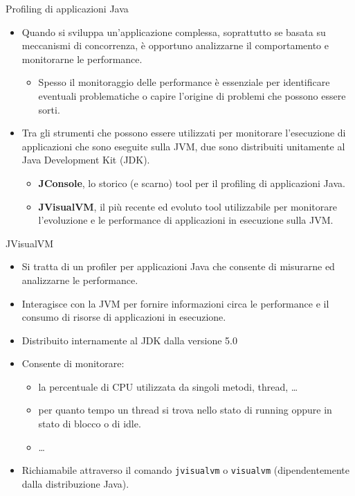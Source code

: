 \documentclass[presentation]{beamer}
\begin{document}
\begin{frame}{Profiling di applicazioni Java}
\begin{itemize}\itemsep10pt
\item Quando si sviluppa un'applicazione complessa, soprattutto se basata su meccanismi di concorrenza, è opportuno analizzarne il comportamento e monitorarne le performance.
\begin{itemize}
\item Spesso il monitoraggio delle performance è essenziale per identificare eventuali problematiche o capire l'origine di problemi che possono essere sorti.
\end{itemize}
\item Tra gli strumenti che possono essere utilizzati per monitorare l'esecuzione di applicazioni che sono eseguite sulla JVM, due sono distribuiti unitamente al Java Development Kit (JDK).
\begin{itemize}
\item \textbf{JConsole}, lo storico (e scarno) tool per il profiling di applicazioni Java.
\item \textbf{JVisualVM}, il più recente ed evoluto tool utilizzabile per monitorare l'evoluzione e le performance di applicazioni in esecuzione sulla JVM.
\end{itemize}
\end{itemize}
\end{frame}

\begin{frame}{JVisualVM}
\begin{itemize}\itemsep10pt
\item Si tratta di un profiler per applicazioni Java che consente di misurarne ed analizzarne le performance.
\item Interagisce con la JVM per fornire informazioni circa le performance e il consumo di risorse di applicazioni in esecuzione.
\item Distribuito internamente al JDK dalla versione 5.0
\item Consente di monitorare:
\begin{itemize}
\item la percentuale di CPU utilizzata da singoli metodi, thread, \dots
\item per quanto tempo un thread si trova nello stato di running oppure in stato di blocco o di idle.
\item \dots
\end{itemize}
\item Richiamabile attraverso il comando \texttt{jvisualvm} o \texttt{visualvm} (dipendentemente dalla distribuzione Java).
\end{itemize}
\end{frame}
\end{document}
